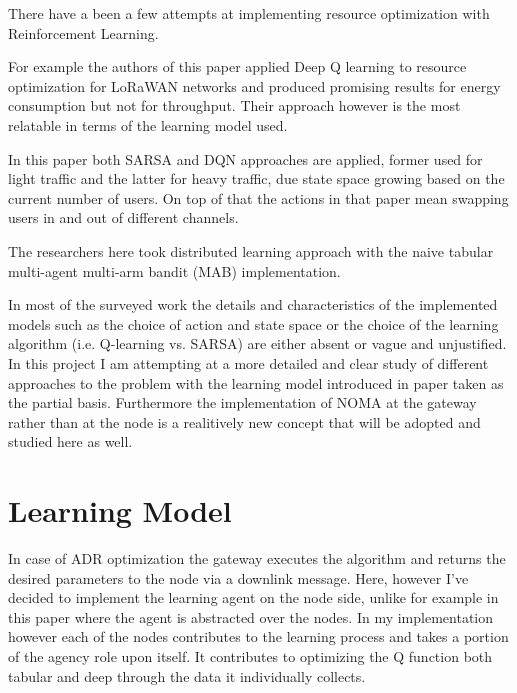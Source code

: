 There have a been a few attempts at implementing resource optimization with Reinforcement Learning. 

For example the
authors of this paper \cite{rl_lora_original} applied 
Deep Q learning to resource optimization for LoRaWAN
networks and produced promising results for energy
consumption but not for throughput. Their approach
however is the most relatable in terms of the learning
model used. 

In this paper \cite{rl_lora_sarsa_dqn} both
SARSA and DQN approaches are applied, former used for
light traffic and the latter for heavy traffic, due state
space growing based on the current number of users. On
top of that the actions in that paper mean swapping users
in and out of different channels. 

The researchers here 
\cite{rl_distributed_mab} took distributed learning
approach with the naive tabular multi-agent multi-arm
bandit (MAB) implementation.

In most of the surveyed work the details and characteristics
of the implemented models such as the choice of action and
state space or the choice of the learning algorithm 
(i.e. Q-learning vs. SARSA) are either absent or vague and 
unjustified. In this project I am attempting at a more
detailed and clear study of different approaches to the 
problem with the learning model introduced in paper \cite{rl_lora_original} taken as the partial basis. 
Furthermore the implementation of NOMA at the gateway
rather than at the node is a realitively new concept
that will be adopted and studied here as well.

\section{Learning Model}

In case of ADR optimization the gateway executes the algorithm
and returns the desired parameters to the node via a downlink 
message. Here, however I've decided to implement the learning 
agent on the node side, unlike for example in this paper 
\cite{rl_lora_sarsa_dqn} where the agent is abstracted over the
nodes. In my implementation however each of the nodes
contributes to the learning process and takes a portion of the
agency role upon itself. It contributes to optimizing the Q function both tabular and deep through the data it individually collects.

